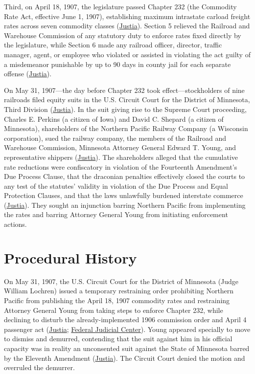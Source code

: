 \documentclass[12pt]{article}
\begin{document}
Third, on April 18, 1907, the legislature passed Chapter 232 (the Commodity Rate Act, effective June 1, 1907), establishing maximum intrastate carload freight rates across seven commodity classes (\href{https://supreme.justia.com/cases/federal/us/209/123/}{Justia}). Section 5 relieved the Railroad and Warehouse Commission of any statutory duty to enforce rates fixed directly by the legislature, while Section 6 made any railroad officer, director, traffic manager, agent, or employee who violated or assisted in violating the act guilty of a misdemeanor punishable by up to 90 days in county jail for each separate offense (\href{https://supreme.justia.com/cases/federal/us/209/123/}{Justia}).

On May 31, 1907---the day before Chapter 232 took effect---stockholders of nine railroads filed equity suits in the U.S. Circuit Court for the District of Minnesota, Third Division (\href{https://supreme.justia.com/cases/federal/us/209/123/}{Justia}). In the suit giving rise to the Supreme Court proceeding, Charles E. Perkins (a citizen of Iowa) and David C. Shepard (a citizen of Minnesota), shareholders of the Northern Pacific Railway Company (a Wisconsin corporation), sued the railway company, the members of the Railroad and Warehouse Commission, Minnesota Attorney General Edward T. Young, and representative shippers (\href{https://supreme.justia.com/cases/federal/us/209/123/}{Justia}). The shareholders alleged that the cumulative rate reductions were confiscatory in violation of the Fourteenth Amendment's Due Process Clause, that the draconian penalties effectively closed the courts to any test of the statutes' validity in violation of the Due Process and Equal Protection Clauses, and that the laws unlawfully burdened interstate commerce (\href{https://supreme.justia.com/cases/federal/us/209/123/}{Justia}). They sought an injunction barring Northern Pacific from implementing the rates and barring Attorney General Young from initiating enforcement actions.

\section{Procedural History}

On May 31, 1907, the U.S. Circuit Court for the District of Minnesota (Judge William Lochren) issued a temporary restraining order prohibiting Northern Pacific from publishing the April 18, 1907 commodity rates and restraining Attorney General Young from taking steps to enforce Chapter 232, while declining to disturb the already-implemented 1906 commission order and April 4 passenger act (\href{https://supreme.justia.com/cases/federal/us/209/123/}{Justia}; \href{https://www.fjc.gov/history/cases/cases-that-shaped-the-federal-courts/ex-parte-young}{Federal Judicial Center}). Young appeared specially to move to dismiss and demurred, contending that the suit against him in his official capacity was in reality an unconsented suit against the State of Minnesota barred by the Eleventh Amendment (\href{https://supreme.justia.com/cases/federal/us/209/123/}{Justia}). The Circuit Court denied the motion and overruled the demurrer.
\end{document}
